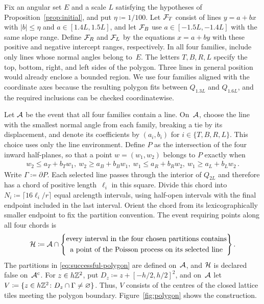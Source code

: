 \documentclass[11pt,letterpaper]{article}
\begin{document}
Fix an angular set $E$ and a scale $L$ satisfying the hypotheses of Proposition~\ref{prop:initial}, and put $\eta\coloneqq1/100$. Let $\mathcal F_T$ consist of lines $y=a+bx$ with $\lvert b\rvert\le\eta$ and $a\in[1.4L,1.5L]$, and let $\mathcal F_B$ use $a\in[-1.5L,-1.4L]$ with the same slope range. Define $\mathcal F_R$ and $\mathcal F_L$ by the equations $x=a+by$ with these positive and negative intercept ranges, respectively. In all four families, include only lines whose normal angles belong to~$E$. The letters $T,B,R,L$ specify the top, bottom, right, and left sides of the polygon. Three lines in general position would already enclose a bounded region. We use four families aligned with the coordinate axes because the resulting polygon fits between $Q_{1.3L}$ and $Q_{1.6L}$, and the required inclusions can be checked coordinatewise.

Let $\mathcal A$ be the event that all four families contain a line. On~$\mathcal A$, choose the line with the smallest normal angle from each family, breaking a tie by its displacement, and denote its coefficients by $(a_i,b_i)$ for $i\in\{T,B,R,L\}$. This choice uses only the line environment. Define $P$ as the intersection of the four inward half-planes, so that a point $w=(w_1,w_2)$ belongs to $P$ exactly when
\begin{equation}\label{eq:polygon-definition}
  \begin{aligned}
    w_2\le a_T+b_Tw_1,\  w_2\ge a_B+b_Bw_1,\  w_1\le a_R+b_Rw_2,\ w_1\ge a_L+b_Lw_2\,.
  \end{aligned}
\end{equation}
Write $\Gamma\coloneqq\partial P$. Each selected line passes through the interior of $Q_{2L}$ and therefore has a chord of positive length~$\ell_i$ in this square. Divide this chord into $N_i\coloneqq\lceil16\ell_i/r\rceil$ equal arclength intervals, using half-open intervals with the final endpoint included in the last interval. Orient the chord from its lexicographically smaller endpoint to fix the partition convention. The event requiring points along all four chords is
\begin{equation}\label{eq:successful-polygon}
  \mathcal H\coloneqq\mathcal A\cap\Bigg\{
    \begin{gathered}
      \text{every interval in the four chosen partitions contains}\\
      \text{a point of the Poisson process on its selected line}
    \end{gathered}
  \Bigg\}\,.
\end{equation}
The partitions in \eqref{eq:successful-polygon} are defined on~$\mathcal A$, and $\mathcal H$ is declared false on~$\mathcal A^{\mathrm{c}}$. For $z\in h\mathbb Z^2$, put $D_z\coloneqq z+[-h/2,h/2]^2$, and on~$\mathcal A$ let $V\coloneqq\{z\in h\mathbb Z^2\colon D_z\cap\Gamma\neq\varnothing\}$. Thus, $V$ consists of the centres of the closed lattice tiles meeting the polygon boundary. Figure~\ref{fig:polygon} shows the construction.
\end{document}
